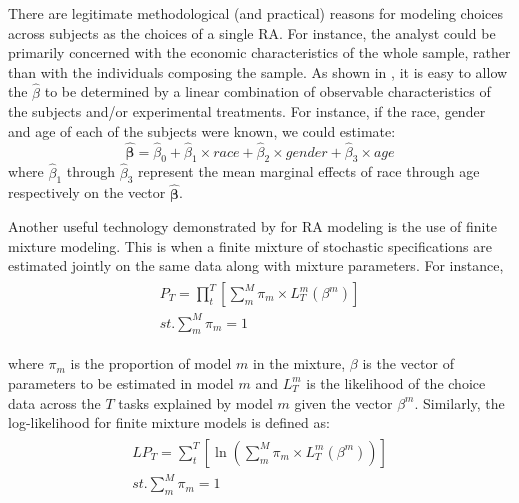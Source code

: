 \documentclass[../main.tex]{subfiles}
\begin{document}
There are legitimate methodological (and practical) reasons for modeling choices across subjects as the choices of a single RA.
For instance, the analyst could be primarily concerned with the economic characteristics of the whole sample, rather than with the individuals composing the sample.
As shown in \textcite[142]{Harrison2008a}, it is easy to allow the $\hat{\beta}$ to be determined by a linear combination of observable characteristics of the subjects and/or experimental treatments.
For instance, if the race, gender and age of each of the subjects were known, we could estimate:
\begin{equation}
	\label{eq3:BB}
	\bm{\hat{\beta}} = \hat{\beta}_0 + \hat{\beta}_1 \times \mathit{race} + \hat{\beta}_2 \times \mathit{gender} + \hat{\beta}_3 \times \mathit{age}
\end{equation}
\noindent where $\hat{\beta}_1$ through $\hat{\beta}_3$ represent the mean marginal effects{\footnotemark} of race through age respectively on the vector $\bm{\hat{\beta}}$.

\addtocounter{footnote}{-1}


Another useful technology demonstrated by \textcite{Harrison2008a} for RA modeling is the use of finite mixture modeling.
This is when a finite mixture of stochastic specifications are estimated jointly on the same data along with mixture parameters.
For instance,
\begin{align}
	\label{eq3:PT_Mix}
	\begin{split}
		\bm{\mathit{P_T}} = \prod_t^T \left[ \sum_m^M \pi_m \times L_T^m(\beta^m) \right]\\
		\mathit{st.} \sum_m^M \pi_m = 1
	\end{split}
\end{align}

\noindent where $\pi_m$ is the proportion of model $m$ in the mixture, $\beta$ is the vector of parameters to be estimated in model $m$ and $L_T^m$ is the likelihood of the choice data across the $T$ tasks explained by model $m$ given the vector $\beta^m$.
Similarly, the log-likelihood for finite mixture models is defined as:
\begin{align}
	\label{eq3:LPT_Mix}
	\begin{split}
		\bm{\mathit{LP_T}} = \sum_t^T \left[ \ln \left( \sum_m^M \pi_m \times L_T^m(\beta^m) \right) \right]\\
		\mathit{st.} \sum_m^M \pi_m = 1
	\end{split}
\end{align}
\end{document}
